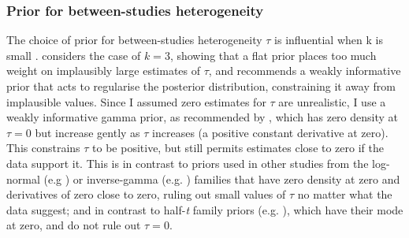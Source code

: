 \subsubsection{Prior for between-studies heterogeneity}

The choice of prior for between-studies heterogeneity $\tau$ is influential when k is small \autocite{seide2019LikelihoodbasedRandomeffectsMetaanalysis}.
\textcite{gelman2006PriorDistributionsVariance} considers the case of $k=3$, showing that a flat prior places too much weight on implausibly large estimates of $\tau$, and recommends a weakly informative prior that acts to regularise the posterior distribution, constraining it away from implausible values.
%
%
%
Since I assumed zero estimates for $\tau$ are unrealistic, I use a weakly informative gamma prior, as recommended by
\textcite{chung2013NondegeneratePenalizedLikelihood}, which has zero density at $\tau = 0$ but increase gently as $\tau$ increases (a positive constant derivative at zero).
This constrains $\tau$ to be positive, but still permits estimates close to zero if the data support it.
This is in contrast to priors used in other studies from the log-normal (e.g \autocite{pullenayegum2011InformedReferencePrior,turner2015PredictiveDistributionsBetweenstudy}) or inverse-gamma (e.g. \autocite{higgins1996BorrowingStrengthExternal}) families that have zero density at zero and derivatives of zero close to zero, ruling out small values of $\tau$ no matter what the data suggest; 
and in contrast to half-\textit{t} family priors (e.g. \autocite{gelman2006PriorDistributionsVariance,seide2019LikelihoodbasedRandomeffectsMetaanalysis}), which have their mode at zero, and do not rule out $\tau=0$.

